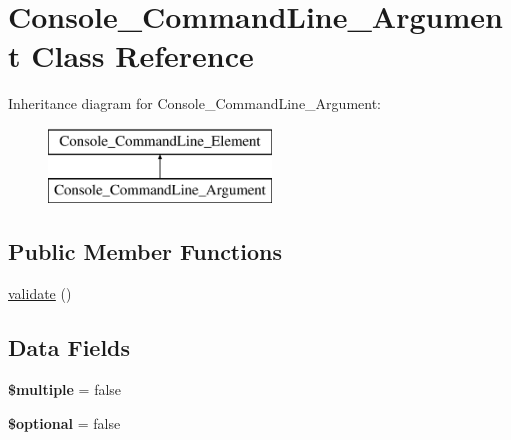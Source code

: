 \hypertarget{class_console___command_line___argument}{
\section{Console\_\-CommandLine\_\-Argument Class Reference}
\label{class_console___command_line___argument}
}
Inheritance diagram for Console\_\-CommandLine\_\-Argument:\begin{figure}[H]
\begin{center}
\leavevmode
\includegraphics[height=2.000000cm]{class_console___command_line___argument}
\end{center}
\end{figure}
\subsection*{Public Member Functions}
\begin{DoxyCompactItemize}
\item 
\hyperlink{class_console___command_line___argument_a184909dab34698899937d810a9f5d393}{validate} ()
\end{DoxyCompactItemize}
\subsection*{Data Fields}
\begin{DoxyCompactItemize}
\item 
\hypertarget{class_console___command_line___argument_a17e227bf0681e8fe65c2604112b28da6}{
{\bfseries \$multiple} = false}
\label{class_console___command_line___argument_a17e227bf0681e8fe65c2604112b28da6}

\item 
\hypertarget{class_console___command_line___argument_a8d50efd090a3dbb81de883567a422a5f}{
{\bfseries \$optional} = false}
\label{class_console___command_line___argument_a8d50efd090a3dbb81de883567a422a5f}

\end{DoxyCompactItemize}


